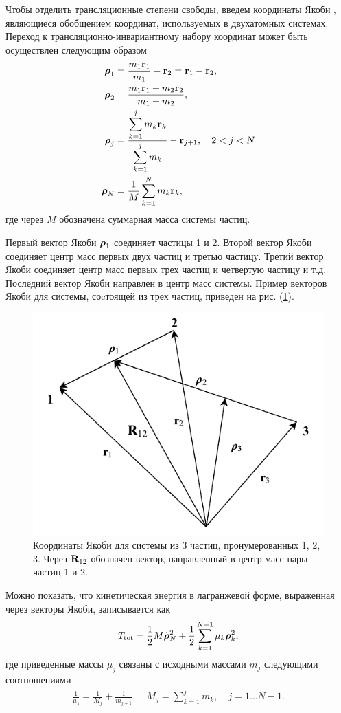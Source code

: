 Чтобы отделить трансляционные степени свободы, введем координаты Якоби \cite{greiner, littlejohn1995}, являющиеся обобщением координат, используемых в двухатомных системах. Переход к трансляционно-инвариантному набору координат может быть осуществлен следующим образом \cite{greiner}
\begin{gather}  
    \begin{aligned}
        \boldsymbol{\rho}_1 &= \frac{m_1 \mathbf{r}_1}{m_1} - \mathbf{r}_2 = \mathbf{r}_1 - \mathbf{r}_2, \\
        \boldsymbol{\rho}_2 &= \frac{m_1 \mathbf{r}_1 + m_2 \mathbf{r}_2}{m_1 + m_2}, \\
        \boldsymbol{\rho}_j &= \frac{\displaystyle \sum_{k = 1}^j m_k \mathbf{r}_k}{\displaystyle \sum_{k = 1}^j m_k} - \mathbf{r}_{j + 1}, \quad 2 < j < N \\
        \boldsymbol{\rho}_N &= \frac{1}{M} \sum_{k = 1}^N m_k \mathbf{r}_k,
    \end{aligned}
\end{gather}
%
где через $M$ обозначена суммарная масса системы частиц. \par
Первый вектор Якоби $\boldsymbol{\rho}_1$ соединяет частицы 1 и 2. Второй вектор Якоби соединяет центр масс первых двух частиц и третью частицу. Третий вектор Якоби соединяет центр масс первых трех частиц и четвертую частицу и т.д. Последний вектор Якоби направлен в центр масс системы. Пример векторов Якоби для системы, соcтоящей из трех частиц, приведен на рис. (\ref{fig:jacobi_coordinates}). 

\begin{figure}
    \centering
    \includegraphics[width=0.5\linewidth]{pictures/jacobi_coordinates.pdf}
    \caption{Координаты Якоби  для системы из 3 частиц, пронумерованных 1, 2, 3. Через $\mathbf{R}_{12}$ обозначен вектор, направленный в центр масс пары частиц 1 и 2.}
    \label{fig:jacobi_coordinates}
\end{figure}

Можно показать, что кинетическая энергия в лагранжевой форме, выраженная через векторы Якоби, записывается как \cite{greiner} 
\begin{gather}
    T_\text{tot} = \frac{1}{2} M \dot{\boldsymbol{\rho}}_N^2 + \frac{1}{2} \sum_{k = 1}^{N - 1} \mu_k \dot{\boldsymbol{\rho}}_k^2,
\end{gather}
%
где приведенные массы $\mu_j$ связаны с исходными массами $m_j$ следующими соотношениями
\begin{gather}
    \frac{1}{\mu_j} = \frac{1}{M_j} + \frac{1}{m_{j+1}}, \quad M_j = \sum_{k = 1}^j m_k, \quad j = 1 \dots N - 1. \label{polyatom-jacobi-masses}
\end{gather}

